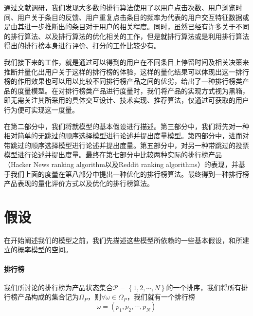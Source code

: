 \documentclass[UTF8]{ctexart}
\theoremstyle{plain}
\theoremstyle{definition}
\theoremstyle{remark}
\begin{document}
    通过文献调研\cite{agichtein2006improving}\cite{barrett2009enhanced}\cite{nematzadeh2017algorithmic}\cite{nie2005object}\cite{zehlike2017fa}，我们发现大多数的排行算法使用了以用户点击次数、用户浏览时间、用户关于条目的反馈、用户重复点击条目的频率为代表的用户交互特征数据或是由其进一步推断出的条目对于用户的相关程度。同时，虽然已经有许多关于不同的排行算法、以及排行算法的优化相关的工作，但是就排行算法或是利用排行算法得出的排行榜本身进行评价、打分的工作比较少有。

    我们接下来的工作，就是通过可以得到的用户在不同条目上停留时间及相关决策来推断并量化出用户关于这样的排行榜的体验，这样的量化结果可以体现出这一排行榜的作用效果也可以用以比较不同排行榜产品之间的优劣，给出了一种排行榜类产品的度量模型。在对排行榜类产品进行度量时，我们将产品的实现方式视为黑箱，即无需关注其所采用的具体交互设计、技术实现、推荐算法，仅通过可获取的用户行为便可实现这一度量。

    在第二部分中，我们将就模型的基本假设进行描述。第三部分中，我们将先对一种相对简单的无跳过的顺序选择模型进行论述并提出度量模型。第四部分中，进而对带跳过的顺序选择模型进行论述并提出度量。第五部分中，对另一种带跳过的投票模型进行论述并提出度量。最终在第七部分中比较两种实际的排行榜产品（Hacker News ranking algorithm以及Reddit ranking algorithms）的表现，并基于我们上面的度量在第八部分中提出一种优化的排行榜算法。最终得到一种排行榜产品表现的量化评价方式以及优化的排行榜算法。

	\section{假设}
	在开始阐述我们的模型之前，我们先描述这些模型所依赖的一些基本假设，和所建立的概率模型的空间。
	\paragraph{排行榜} 我们所讨论的排行榜为产品状态集合$\mathcal{P}=\left\{1,2,\cdots,N \right\}$的一个排序，我们将所有排行榜产品构成的集合记为$\Omega_P$，则$\forall \omega \in \Omega_P$，我们就有一个排行榜
	$$
	\omega = (p_1,p_2,\cdots,p_N)
	$$
\end{document}
